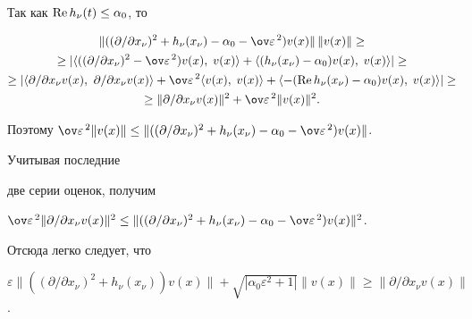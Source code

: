 \begin{pf} 


Так как $\operatorname{Re} h_\nu(t)\le\alpha_0$, то 


\begin{multline*} 


\|((\partial/\partial x_\nu)^2+h_\nu(x_\nu)-\alpha_0- 


\ov\varepsilon^{\,2})v(x)\|\,\|v(x)\|\ge \\ 


\ge|\la((\partial/\partial x_\nu)^2-\ov\varepsilon^{\,2}) 


v(x),\;v(x)\ra+\la(h_\nu(x_\nu)-\alpha_0)v(x),\;v(x)\ra|\ge \\ 


\ge |\la\partial/\partial x_\nu v(x),\ \partial/\partial x_\nu 


v(x)\ra+\ov\varepsilon^{\,2}\la v(x),\;v(x)\ra+ 


\la-(\re h_\nu(x_\nu)-\alpha_0)v(x),\;v(x)\ra|\ge \\ 


\ge \|\partial/\partial x_\nu v(x)\|^2+\ov\varepsilon^{\,2} 


\|v(x)\|^2. 


\end{multline*} 


Поэтому $\ov\varepsilon^{\,2}\|v(x)\|\le\|((\partial/\partial 


x_\nu)^2+h_\nu(x_\nu)-\alpha_0-\ov\varepsilon^{\,2})v(x)\|$. 


Учитывая последние 


две серии оценок, получим 


$\ov\varepsilon^{\,2}\|\partial/\partial x_\nu v(x)\|^2\le 


\|((\partial/\partial x_\nu)^2+h_\nu(x_\nu)-\alpha_0- 


\ov\varepsilon^{\,2})v(x)\|^2$. 


Отсюда легко следует, что 


$\varepsilon\|((\partial/\partial x_\nu)^2+h_\nu(x_\nu))v(x)\|+ 


\sqrt{|\alpha_0\varepsilon^2+1|} 


\|v(x)\|\ge\|\partial/\partial x_\nu v(x)\|$. 


\end{pf} 


 


